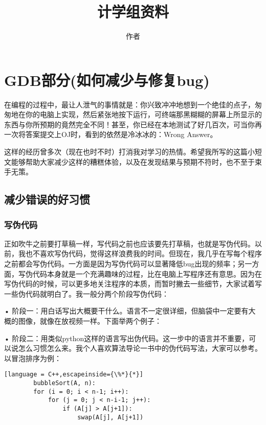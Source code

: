 \documentclass[UTF8]{ctexart}
\title{计学组资料}
\author{作者}
\date{}
\begin{document}
	\maketitle
	\thispagestyle{empty}
	\newpage
	\setcounter{page}{1}
\newpage
\tableofcontents
\newpage
\section{GDB部分(如何减少与修复bug)}
在编程的过程中，最让人泄气的事情就是：你兴致冲冲地想到一个绝佳的点子，匆匆地在你的电脑上实现，然后紧张地按下运行，可终端那黑糊糊的屏幕上所显示的东西与你所预期的竟然完全不同！甚至，你已经在本地测试了好几百次，可当你再一次将答案提交上OJ时，看到的依然是冷冰冰的：Wrong Answer。

这样的经历曾多次（现在也时不时）打消我对学习的热情。希望我所写的这篇小短文能够帮助大家减少这样的糟糕体验，以及在发现结果与预期不符时，也不至于束手无策。

\subsection{减少错误的好习惯}

\subsubsection{写伪代码}
正如吹牛之前要打草稿一样，写代码之前也应该要先打草稿，也就是写伪代码。以前，我也不喜欢写伪代码，觉得这样浪费我的时间。但现在，我几乎在写每个程序之前都会写伪代码。一方面是因为写伪代码可以显著降低bug出现的频率；另一方面，写伪代码本身就是一个充满趣味的过程，比在电脑上写程序还有意思。因为在写伪代码的时候，可以更多地关注程序的本质，而暂时撇去一些细节，大家试着写一些伪代码就明白了。我一般分两个阶段写伪代码：

• 阶段一：用白话写出大概要干什么。语言不一定很详细，但脑袋中一定要有大概的图像，就像在放视频一样。下面举两个例子：


• 阶段二：用类似python这样的语言写出伪代码。这一步中的语言并不重要，可以说怎么习惯怎么来。我个人喜欢算法导论一书中的伪代码写法，大家可以参考。以冒泡排序为例：
\begin{lstlisting}[language = C++,escapeinside={\%*}{*}]
        bubbleSort(A, n):
        for (i = 0; i < n-1; i++):
            for (j = 0; j < n-i-1; j++):
                if (A[j] > A[j+1]):
                    swap(A[j], A[j+1])
\end{lstlisting}
\end{document}
